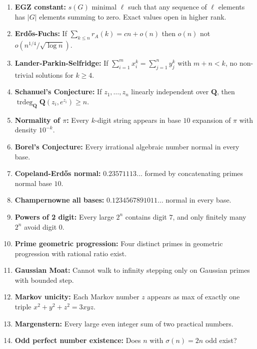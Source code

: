 \documentclass[aps,prd,amsmath,amssymb,twocolumn,superscriptaddress]{revtex4-2}
\begin{document}
\begin{enumerate}[label={\bf \arabic*.}, leftmargin=*, itemsep=2pt]
\item \textbf{EGZ constant:} $s(G)$ minimal $\ell$ such that any sequence of $\ell$ elements has $|G|$ elements summing to zero. Exact values open in higher rank.

\item \textbf{Erd\H{o}s-Fuchs:} If $\sum_{k\le n}r_A(k)=cn+o(n)$ then $o(n)$ not $o(n^{1/4}/\sqrt{\log n})$.

\item \textbf{Lander-Parkin-Selfridge:} If $\sum_{i=1}^m x_i^k=\sum_{j=1}^n y_j^k$ with $m+n<k$, no non-trivial solutions for $k\ge4$.

\item \textbf{Schanuel's Conjecture:} If $z_1,\dots,z_n$ linearly independent over $\mathbf Q$, then $\operatorname{trdeg}_{\mathbf Q}\mathbf Q(z_i,e^{z_i})\ge n$.

\item \textbf{Normality of $\pi$:} Every $k$-digit string appears in base $10$ expansion of $\pi$ with density $10^{-k}$.

\item \textbf{Borel's Conjecture:} Every irrational algebraic number normal in every base.

\item \textbf{Copeland-Erd\H{o}s normal:} $0.23571113\ldots$ formed by concatenating primes normal base $10$.

\item \textbf{Champernowne all bases:} $0.1234567891011\ldots$ normal in every base.

\item \textbf{Powers of 2 digit:} Every large $2^n$ contains digit $7$, and only finitely many $2^n$ avoid digit $0$.

\item \textbf{Prime geometric progression:} Four distinct primes in geometric progression with rational ratio exist.

\item \textbf{Gaussian Moat:} Cannot walk to infinity stepping only on Gaussian primes with bounded step.

\item \textbf{Markov unicity:} Each Markov number $z$ appears as max of exactly one triple $x^2+y^2+z^2=3xyz$.

\item \textbf{Margenstern:} Every large even integer sum of two practical numbers.

\item \textbf{Odd perfect number existence:} Does $n$ with $\sigma(n)=2n$ odd exist?


\end{enumerate}
\end{document}

